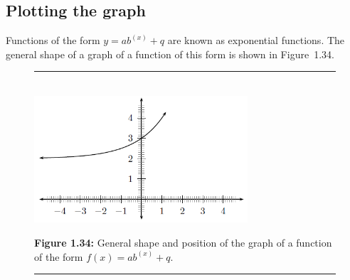 \subsection*{Plotting the graph}         
Functions of the form $y=a{b}^{(x)}+q$ are known as exponential functions. The general shape of a graph of a function of this form is shown in Figure~1.34.\par 
\setcounter{subfigure}{0}
\begin{figure}[H] %
\begin{center}
\rule[.1in]{\figurerulewidth}{.005in} \\
\label{m39348*uid173!!!underscore!!!media}\label{m39348*uid173!!!underscore!!!printimage}\includegraphics[width=300px]{col11306.imgs/m39348_MG10C11_027.png} %
\vspace{2pt}
\vspace{\rubberspace}\par \begin{cnxcaption}
\small \textbf{Figure 1.34: }General shape and position of the graph of a function of the form $f(x)=a{b}^{(x)}+q$.
\end{cnxcaption}
\vspace{.1in}
\rule[.1in]{\figurerulewidth}{.005in} \\
\end{center}
\end{figure}       

